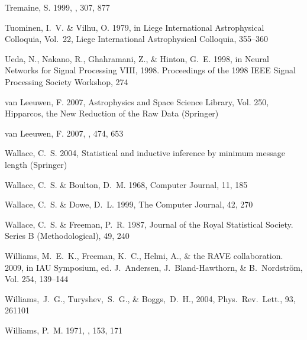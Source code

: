 \begin{thebibliography}{99}
{Tremaine}, S. 1999, \mnras, 307, 877

{Tuominen}, I.~V. \& {Vilhu}, O. 1979, in Liege International Astrophysical
  Colloquia, Vol.~22, Liege International Astrophysical Colloquia, 355--360

{Ueda}, N., {Nakano}, R., {Ghahramani}, Z., \& {Hinton}, G.~E. 1998, in {Neural
  Networks for Signal Processing VIII, 1998. Proceedings of the 1998 IEEE
  Signal Processing Society Workshop}, 274

{van Leeuwen}, F. 2007{}, Astrophysics and Space Science Library,
  Vol. 250, {Hipparcos, the New Reduction of the Raw Data} ({Springer})

{van Leeuwen}, F. 2007{}, \aap, 474, 653

{Wallace}, C.~S. 2004, {Statistical and inductive inference by minimum message
  length} ({Springer})

{Wallace}, C.~S. \& {Boulton}, D.~M. 1968, {Computer Journal}, 11, 185

{Wallace}, C.~S. \& {Dowe}, D.~L. 1999, {The Computer Journal}, 42, 270

{Wallace}, C.~S. \& {Freeman}, P.~R. 1987, Journal of the Royal Statistical
  Society. Series B (Methodological), 49, 240

{Williams}, M.~E.~K., {Freeman}, K.~C., {Helmi}, A., \& {the RAVE
  collaboration}. 2009, in IAU Symposium, ed. J.~{Andersen},
  J.~{Bland-Hawthorn}, \& B.~{Nordstr{\"o}m}, Vol. 254, 139--144

  Williams,~J.~G., Turyshev,~S.~G., \& Boggs,~D.~H., 2004,
  Phys.~Rev.~Lett., 93, 261101

{Williams}, P.~M. 1971, \mnras, 153, 171


\end{thebibliography}
